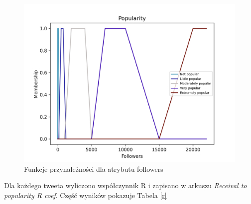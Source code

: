 \documentclass{classrep}
\begin{document}
\begin{figure}[H]
    \centering
    \includegraphics[width=1\textwidth]{resources/stage3/Popularity.png}
    \caption{Funkcje przynależności dla atrybutu followers}
    \label{popularity}
\end{figure}

Dla każdego tweeta wyliczono współczynnik R i zapisano w arkuszu \textit{Receival to popularity R coef}. Część wyników pokazuje Tabela \ref{r}
\end{document}
